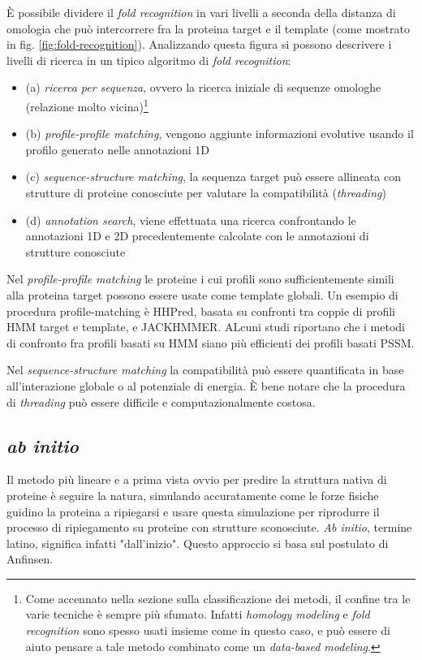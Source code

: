 {È possibile dividere il \textit{fold recognition} in vari livelli a seconda della distanza di omologia che può intercorrere fra la proteina target e il template (come mostrato in fig. \ref{fig:fold-recognition}). Analizzando questa figura si possono descrivere i livelli di ricerca in un tipico algoritmo di \textit{fold recognition}:

\begin{itemize}
	\item (a) \textit{ricerca per sequenza}, ovvero la ricerca iniziale di sequenze omologhe (relazione molto vicina)\footnote{Come accennato nella sezione sulla classificazione dei metodi, il confine tra le varie tecniche è sempre più sfumato. Infatti \textit{homology modeling }e \textit{fold recognition} sono spesso usati insieme come in questo caso, e può essere di aiuto pensare a tale metodo combinato come un \textit{data-based modeling}.}
	\item (b) \textit{profile-profile matching}, vengono aggiunte informazioni evolutive usando il profilo generato nelle annotazioni 1D
	\item (c) \textit{sequence-structure matching}, la sequenza target può essere allineata con strutture di proteine conosciute per valutare la compatibilità (\textit{threading})
	\item (d) \textit{annotation search}, viene effettuata una ricerca confrontando le annotazioni 1D e 2D precedentemente calcolate con le annotazioni di strutture conosciute
\end{itemize}

Nel \textit{profile-profile matching} le proteine i cui profili sono sufficientemente simili alla proteina target possono essere usate come template globali. Un esempio di procedura profile-matching è HHPred, basata su confronti tra coppie di profili HMM target e template, e JACKHMMER. ALcuni studi riportano che i metodi di confronto fra profili basati su HMM siano più efficienti dei profili basati PSSM\supercite{joseph2014local}.

\par Nel \textit{sequence-structure matching} la compatibilità può essere quantificata in base all'interazione globale o al potenziale di energia. È bene notare che la procedura di \textit{threading} può essere difficile e computazionalmente costosa.


\subsection{\textit{ab initio}} \label{sec:ab-initio}
{
Il metodo più lineare e a prima vista ovvio per predire la struttura nativa di proteine è seguire la natura, simulando accuratamente come le forze fisiche guidino la proteina a ripiegarsi e usare questa simulazione per riprodurre il processo di ripiegamento su proteine con strutture sconosciute. \textit{Ab initio}, termine latino, significa infatti "dall'inizio". Questo approccio si basa sul postulato di Anfinsen.

}}
